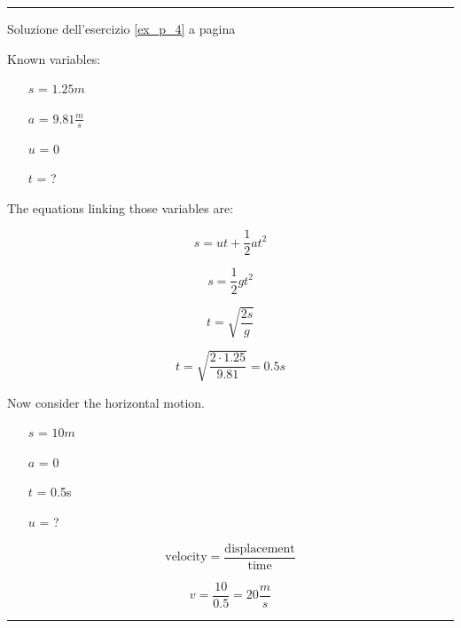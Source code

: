 \vspace{1cm}
\hrule
\vspace{1cm}

Soluzione dell'esercizio \ref{ex_p_4} a pagina \pageref{ex_p_4}\label{sol_p_4}

Known variables:

\begin{itemize}
\item[$s$] = $1.25m$
\item[$a$] = $9.81\frac{m}{s}$
\item[$u$] = 0
\item[$t$] = ?
\end{itemize}

The equations linking those variables are:


\setcounter{equation}{0}
\begin{equation}
s=ut+\frac{1}{2}at^2
\end{equation}

\begin{equation*}
s=\frac{1}{2}gt^2
\end{equation*}



\begin{equation*}
t=\sqrt{\frac{2s}{g}}
\end{equation*}


\begin{equation*}
t=\sqrt{
\frac{
2\cdot 1.25
}{
9.81
}
}=0.5s
\end{equation*}

Now consider the horizontal motion.

\begin{itemize}
\item[$s$] = $10m$
\item[$a$] = $0$
\item[$t$] = 0.5s
\item[$u$] = ?
\end{itemize}



\begin{equation*}
\textrm{velocity}
=\frac{
\textrm{displacement}
}{
\textrm{time}
}
\end{equation*}



\begin{equation*}
v=\frac{10}{0.5}=20\frac{m}{s}
\end{equation*}



\vspace{1cm}
\hrule
\vspace{1cm}


